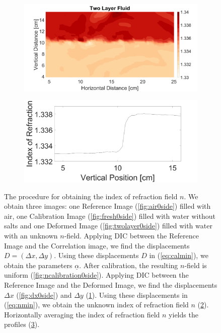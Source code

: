\documentclass{svjour3}                     %
\begin{document}
\begin{figure}[htbp]
\begin{subfigure}{.5\linewidth}
		\label{fig:dy0side}
\end{subfigure}\\
\begin{subfigure}{.5\linewidth}
		\centering \includegraphics[width = \textwidth]{TwoLayernSurf}
		\label{fig:ndeformed0side}
\end{subfigure}%
\begin{subfigure}{.5\linewidth}
	\centering \includegraphics[width = \textwidth]{TwoLayerHorizontalAveraged}
		\label{fig:nprofiles0side}
\end{subfigure}
\caption{The procedure for obtaining the index of refraction field $n$. We obtain three images: one Reference Image (\ref{fig:air0side}) filled with air, one Calibration Image (\ref{fig:fresh0side}) filled with water without salts and one Deformed Image (\ref{fig:twolayer0side}) filled with water with an unknown $n$-field. Applying DIC between the Reference Image and the Correlation image, we find the displacements $D=(\Delta x, \Delta y)$. Using these displacements $D$ in (\ref{eq:calmin}), we obtain the parameters $\underline{\alpha}$. After calibration, the resulting $n$-field is uniform (\ref{fig:ncalibration0side}). Applying DIC between the Reference Image and the Deformed Image, we find the displacements $\Delta x$ (\ref{fig:dx0side}) and $\Delta y$ (\ref{fig:dy0side}).  Using these displacements in (\ref{eq:nmin}), we obtain the unknown index of refraction field $n$ (\ref{fig:ndeformed0side}). Horizontally averaging the index of refraction field $n$ yields the profiles (\ref{fig:nprofiles0side}).}
\label{fig:0side}
\end{figure}
\end{document}
